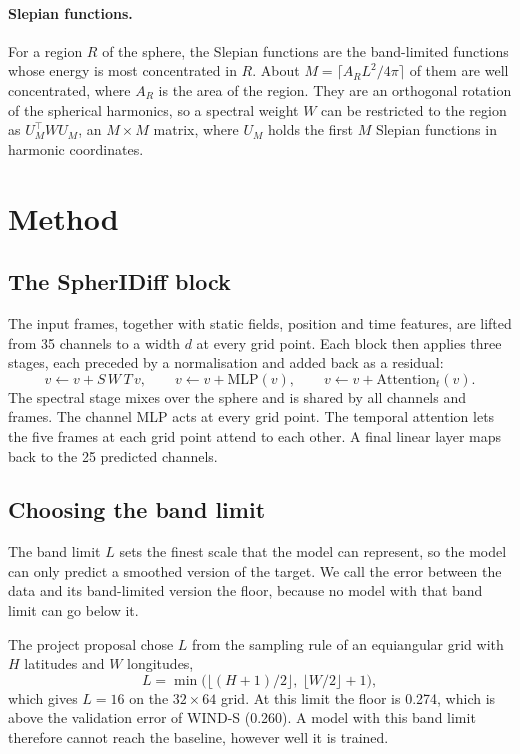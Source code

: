 \documentclass{article}
\begin{document}
\paragraph{Slepian functions.}
For a region $R$ of the sphere, the Slepian functions are the band-limited functions whose energy is most concentrated in $R$. About $M=\lceil A_R L^2/4\pi\rceil$ of them are well concentrated, where $A_R$ is the area of the region. They are an orthogonal rotation of the spherical harmonics, so a spectral weight $W$ can be restricted to the region as $U_M^\top W U_M$, an $M\times M$ matrix, where $U_M$ holds the first $M$ Slepian functions in harmonic coordinates.

\section{Method}
\label{sec:method}

\subsection{The SpherIDiff block}

The input frames, together with static fields, position and time features, are lifted from 35 channels to a width $d$ at every grid point. Each block then applies three stages, each preceded by a normalisation and added back as a residual:
\begin{equation}
  v \leftarrow v + S\,W\,T\,v, \qquad v \leftarrow v + \text{MLP}(v), \qquad v \leftarrow v + \text{Attention}_t(v).
\end{equation}
The spectral stage mixes over the sphere and is shared by all channels and frames. The channel MLP acts at every grid point. The temporal attention lets the five frames at each grid point attend to each other. A final linear layer maps back to the 25 predicted channels.

\subsection{Choosing the band limit}
\label{sec:bandlimit}

The band limit $L$ sets the finest scale that the model can represent, so the model can only predict a smoothed version of the target. We call the error between the data and its band-limited version the floor, because no model with that band limit can go below it.

The project proposal chose $L$ from the sampling rule of an equiangular grid with $H$ latitudes and $W$ longitudes,
\begin{equation}
  L=\min\bigl(\lfloor (H+1)/2\rfloor,\ \lfloor W/2\rfloor+1\bigr),
\end{equation}
which gives $L=16$ on the $32\times64$ grid. At this limit the floor is 0.274, which is above the validation error of WIND-S (0.260). A model with this band limit therefore cannot reach the baseline, however well it is trained.
\end{document}

